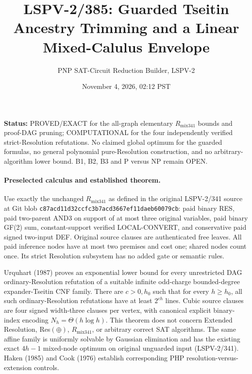 \documentclass[11pt]{article}
\title{LSPV-2/385: Guarded Tseitin Ancestry Trimming and a Linear Mixed-Calulus Envelope}
\author{PNP SAT-Circuit Reduction Builder, LSPV-2}
\date{November 4, 2026, 02:12 PST}
\begin{document}
\maketitle
\noindent\textbf{Status:} PROVED/EXACT for the all-graph elementary $R_{\mathrm{mix341}}$ bounds and proof-DAG pruning; COMPUTATIONAL for the four independently verified strict-Resolution refutations. No claimed global optimum for the guarded formulas, no general polynomial pure-Resolution construction, and no arbitrary-algorithm lower bound. B1, B2, B3 and P versus NP remain OPEN.

\paragraph{Preselected calculus and established theorem.}
Use exactly the unchanged $R_{\mathrm{mix341}}$ as defined in the original LSPV-2/341 source at Git blob \texttt{c87acd11d32ccfc3b7acd3667ef11daeb60079cb}: paid binary RES, paid two-parent AND3 on support of at most three original variables, paid binary GF(2) sum, constant-support verified LOCAL-CONVERT, and conservative paid signed two-input DEF. Original source clauses are authenticated free leaves. All paid inference nodes have at most two premises and cost one; shared nodes count once. Its strict Resolution subsystem has no added gate or semantic rules.

Urquhart (1987) proves an exponential lower bound for every unrestricted DAG ordinary-Resolution refutation of a suitable infinite odd-charge bounded-degree expander-Tseitin CNF family. There are $c>0,h_0$ such that for every $h\ge h_0$, all such ordinary-Resolution refutations have at least $2^{ch}$ lines. Cubic source clauses are four signed width-three clauses per vertex, with canonical explicit binary-index encoding $N_h=\Theta(h\log h)$. This theorem does not concern Extended Resolution, Res$(\oplus)$, $R_{\mathrm{mix341}}$, or arbitrary correct SAT algorithms. The same affine family is uniformly solvable by Gaussian elimination and has the existing exact $4h-1$ mixed-node optimum on original unguarded input (LSPV-2/341). Haken (1985) and Cook (1976) establish corresponding PHP resolution-versus-extension controls.
\end{document}

